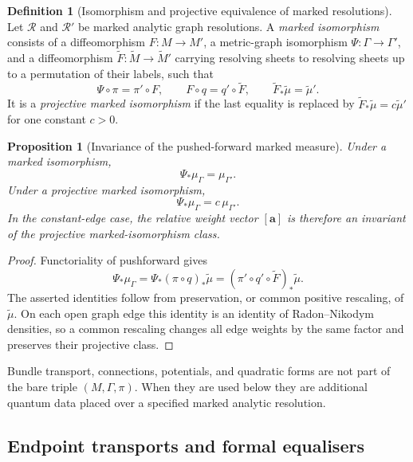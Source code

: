 \documentclass[11pt]{article}
\theoremstyle{plain}
\newtheorem{proposition}[theorem]{Proposition}
\theoremstyle{definition}
\newtheorem{definition}[theorem]{Definition}
\begin{document}
\begin{definition}[Isomorphism and projective equivalence of marked resolutions]
\label{def:marked-resolution-isomorphism}
Let \(\mathcal R\) and \(\mathcal R'\) be marked analytic graph resolutions.
A \emph{marked isomorphism} consists of a diffeomorphism \(F:M\to M'\), a
metric-graph isomorphism \(\Psi:\Gamma\to\Gamma'\), and a diffeomorphism
\(\widetilde F:\widetilde M\to\widetilde M'\) carrying resolving sheets to
resolving sheets up to a permutation of their labels, such that
\[
  \Psi\circ\pi=\pi'\circ F,
  \qquad
  F\circ q=q'\circ\widetilde F,
  \qquad
  \widetilde F_*\widetilde\mu=\widetilde\mu'.
\]
It is a \emph{projective marked isomorphism} if the last equality is replaced
by \(\widetilde F_*\widetilde\mu=c\widetilde\mu'\) for one constant \(c>0\).
\end{definition}

\begin{proposition}[Invariance of the pushed-forward marked measure]
\label{prop:marked-measure-invariance}
Under a marked isomorphism,
\[
  \Psi_*\mu_\Gamma=\mu_{\Gamma'}.
\]
Under a projective marked isomorphism,
\[
  \Psi_*\mu_\Gamma=c\,\mu_{\Gamma'}.
\]
In the constant-edge case, the relative weight vector \([\mathbf a]\) is
therefore an invariant of the projective marked-isomorphism class.
\end{proposition}

\begin{proof}
Functoriality of pushforward gives
\[
  \Psi_*\mu_\Gamma
  =
  \Psi_*(\pi\circ q)_*\widetilde\mu
  =
  (\pi'\circ q'\circ\widetilde F)_*\widetilde\mu.
\]
The asserted identities follow from preservation, or common positive
rescaling, of \(\widetilde\mu\). On each open graph edge this identity is an
identity of Radon--Nikodym densities, so a common rescaling changes all edge
weights by the same factor and preserves their projective class.
\end{proof}

Bundle transport, connections, potentials, and quadratic forms are not part
of the bare triple \((M,\Gamma,\pi)\). When they are used below they are
additional quantum data placed over a specified marked analytic resolution.

\subsection{Endpoint transports and formal equalisers}
\label{subsec:graph-formal-equaliser}
\end{document}
